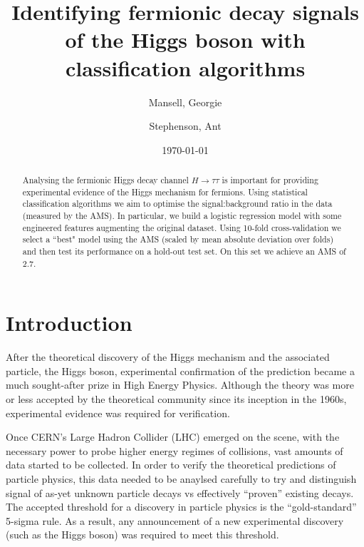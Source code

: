 

\usepackage[toc,page]{appendix}
\usepackage{fancyhdr}
\usepackage{enumitem}
\usepackage{pifont}

\graphicspath{{./figs/}}

\pagestyle{fancy}
\rhead{}
\lhead{}

\author{Mansell, Georgie \and Stephenson, Ant}
\date{\today}
\title{Identifying fermionic decay signals of the Higgs boson with classification algorithms}


\maketitle
\begin{abstract}
    Analysing the fermionic Higgs decay channel $H\rightarrow\tau\tau$ is important for providing experimental evidence of the Higgs mechanism for fermions. Using statistical classification algorithms we aim to optimise the signal:background ratio in the data (measured by the AMS). In particular, we build a logistic regression model with some engineered features augmenting the original dataset. Using 10-fold cross-validation we select a ``best" model using the AMS (scaled by mean absolute deviation over folds) and then test its performance on a hold-out test set. On this set we achieve an AMS of 2.7.
\end{abstract}

\section{Introduction}
After the theoretical discovery of the Higgs mechanism and the associated particle, the Higgs boson, experimental confirmation of the prediction became a much sought-after prize in High Energy Physics. Although the theory was more or less accepted by the theoretical community since its inception in the 1960s, experimental evidence was required for verification. 

Once CERN's Large Hadron Collider (LHC) emerged on the scene, with the necessary power to probe higher energy regimes of collisions, vast amounts of data started to be collected. In order to verify the theoretical predictions of particle physics, this data needed to be anaylsed carefully to try and distinguish signal of as-yet unknown particle decays vs effectively ``proven'' existing decays. The accepted threshold for a discovery in particle physics is the ``gold-standard'' 5-sigma rule. As a result, any announcement of a new experimental discovery (such as the Higgs boson) was required to meet this threshold. 

